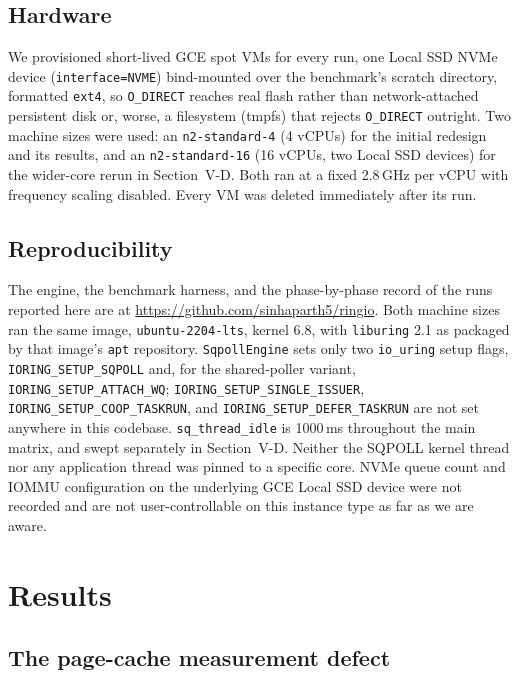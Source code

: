 \documentclass[conference]{IEEEtran}
\begin{document}
\subsection{Hardware}

We provisioned short-lived GCE spot VMs for every run, one Local SSD NVMe device
(\texttt{interface=NVME}) bind-mounted over the benchmark's scratch directory, formatted
\texttt{ext4}, so \texttt{O\_DIRECT} reaches real flash rather than network-attached persistent
disk or, worse, a filesystem (tmpfs) that rejects \texttt{O\_DIRECT} outright. Two machine sizes
were used: an \texttt{n2-standard-4} (4 vCPUs) for the initial redesign and its results, and an
\texttt{n2-standard-16} (16 vCPUs, two Local SSD devices) for the wider-core rerun in
Section~V-D. Both ran at a fixed 2.8\,GHz per vCPU with frequency scaling disabled. Every VM was
deleted immediately after its run.

\subsection{Reproducibility}

The engine, the benchmark harness, and the phase-by-phase record of the runs reported here are
at \url{https://github.com/sinhaparth5/ringio}. Both machine sizes ran the same image, \texttt{ubuntu-2204-lts}, kernel 6.8, with
\texttt{liburing} 2.1 as packaged by that image's \texttt{apt} repository.
\texttt{SqpollEngine} sets only two \texttt{io\_uring} setup flags,
\texttt{IORING\_SETUP\_SQPOLL} and, for the shared-poller variant,
\texttt{IORING\_SETUP\_ATTACH\_WQ}; \texttt{IORING\_SETUP\_SINGLE\_ISSUER},
\texttt{IORING\_SETUP\_COOP\_TASKRUN}, and \texttt{IORING\_SETUP\_DEFER\_TASKRUN} are not set
anywhere in this codebase. \texttt{sq\_thread\_idle} is 1000\,ms throughout the main matrix, and swept
separately in Section~V-D. Neither the SQPOLL kernel thread nor any application thread was pinned to a
specific core. NVMe queue count and IOMMU configuration on the underlying GCE Local SSD device
were not recorded and are not user-controllable on this instance type as far as we are aware.

\section{Results}

\subsection{The page-cache measurement defect}
\end{document}
